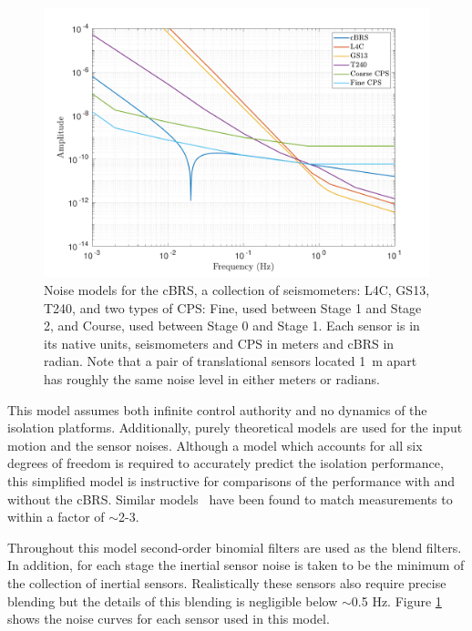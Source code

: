\documentclass [12pt, proquest]{uwthesis}[2019]
\begin{document}
\begin{figure}[!h]
\begin{center}
\includegraphics[width=\textwidth]{cBRS_Model_Noise.pdf}
\caption[Noise models for the cBRS, a collection of seismometers, and two types of CPS]{Noise models for the cBRS, a collection of seismometers: L4C, GS13, T240, and two types of CPS: Fine, used between Stage 1 and Stage 2, and Course, used between Stage 0 and Stage 1. Each sensor is in its native units, seismometers and CPS in meters and cBRS in radian. Note that a pair of translational sensors located 1~m apart has roughly the same noise level in either meters or radians.}
\label{sensNoise}
\end{center}
\end{figure}

This model assumes both infinite control authority and no dynamics of the isolation platforms. Additionally, purely theoretical models are used for the input motion and the sensor noises. Although a model which accounts for all six degrees of freedom is required to accurately predict the isolation performance, this simplified model is instructive for comparisons of the performance with and without the cBRS. Similar models~\cite{windproofing} have been found to match measurements to within a factor of $\sim$2-3.

Throughout this model second-order binomial filters are used as the blend filters. In addition, for each stage the inertial sensor noise is taken to be the minimum of the collection of inertial sensors. Realistically these sensors also require precise blending but the details of this blending is negligible below $\sim$0.5 Hz. Figure \ref{sensNoise} shows the noise curves for each sensor used in this model.
\end{document}
